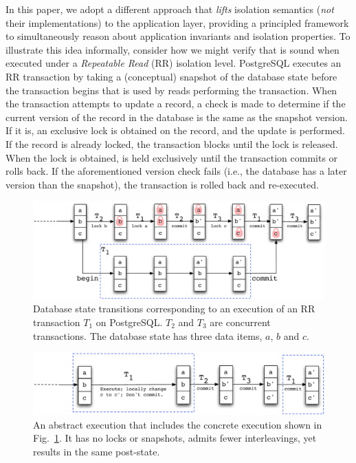 In this paper, we adopt a different approach that \emph{lifts}
isolation semantics (\emph{not} their implementations) to the
application layer, providing a principled framework to simultaneously
reason about application invariants and isolation properties.  To
illustrate this idea informally, consider how we might verify that
 is sound when executed under a \emph{Repeatable Read}
(RR) isolation level.  PostgreSQL executes an RR transaction by taking
a (conceptual) snapshot of the database state before the transaction
begins that is used by reads performing the transaction.  When the
transaction attempts to update a record, a check is made to determine
if the current version of the record in the database is the same as the
snapshot version. If it is, an exclusive lock is obtained on the
record, and the update is performed. If the record is already locked,
the transaction blocks until the lock is released.  When the lock is
obtained, is held exclusively until the transaction commits or rolls
back. If the aforementioned version check fails (i.e., the database
has a later version than the snapshot), the transaction is rolled back
and re-executed.

\begin{figure}[t]
\includegraphics[scale=0.5]{Figures/RR-postgres}
\caption{Database state transitions corresponding to an execution of
  an RR transaction $T_1$ on PostgreSQL. $T_2$ and $T_3$ are concurrent
  transactions. The database state has three data items, $a$, $b$ and $c$. }
\label{fig:rr-postgres}
\end{figure}
\begin{figure}[t]
\includegraphics[scale=0.5]{Figures/RR-abstract}
  \caption{An abstract execution that includes the concrete execution
  shown in Fig.~\ref{fig:rr-postgres}. It has no locks or snapshots,
  admits fewer interleavings, yet results in the same post-state.  }
\label{fig:rr-abstract}
\end{figure}

